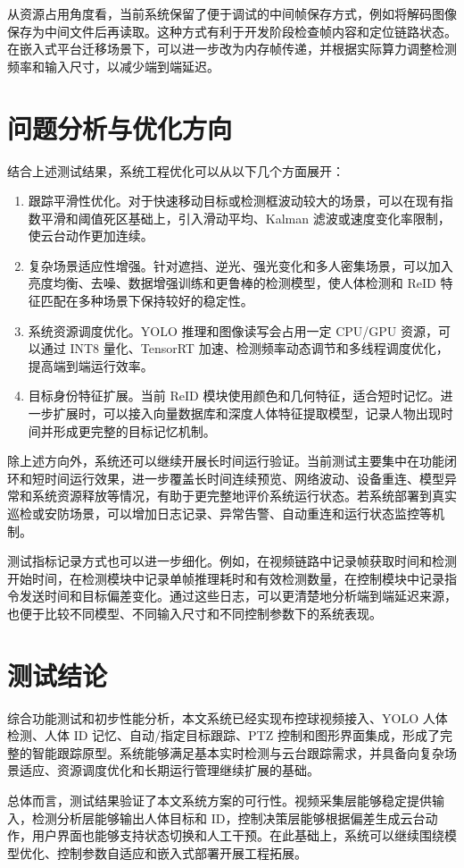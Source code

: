 从资源占用角度看，当前系统保留了便于调试的中间帧保存方式，例如将解码图像保存为中间文件后再读取。这种方式有利于开发阶段检查帧内容和定位链路状态。在嵌入式平台迁移场景下，可以进一步改为内存帧传递，并根据实际算力调整检测频率和输入尺寸，以减少端到端延迟。

\section{问题分析与优化方向}

结合上述测试结果，系统工程优化可以从以下几个方面展开：

\begin{enumerate}
    \item 跟踪平滑性优化。对于快速移动目标或检测框波动较大的场景，可以在现有指数平滑和阈值死区基础上，引入滑动平均、Kalman 滤波或速度变化率限制，使云台动作更加连续。
    \item 复杂场景适应性增强。针对遮挡、逆光、强光变化和多人密集场景，可以加入亮度均衡、去噪、数据增强训练和更鲁棒的检测模型，使人体检测和 ReID 特征匹配在多种场景下保持较好的稳定性。
    \item 系统资源调度优化。YOLO 推理和图像读写会占用一定 CPU/GPU 资源，可以通过 INT8 量化、TensorRT 加速、检测频率动态调节和多线程调度优化，提高端到端运行效率。
    \item 目标身份特征扩展。当前 ReID 模块使用颜色和几何特征，适合短时记忆。进一步扩展时，可以接入向量数据库和深度人体特征提取模型，记录人物出现时间并形成更完整的目标记忆机制。
\end{enumerate}

除上述方向外，系统还可以继续开展长时间运行验证。当前测试主要集中在功能闭环和短时间运行效果，进一步覆盖长时间连续预览、网络波动、设备重连、模型异常和系统资源释放等情况，有助于更完整地评价系统运行状态。若系统部署到真实巡检或安防场景，可以增加日志记录、异常告警、自动重连和运行状态监控等机制。

测试指标记录方式也可以进一步细化。例如，在视频链路中记录帧获取时间和检测开始时间，在检测模块中记录单帧推理耗时和有效检测数量，在控制模块中记录指令发送时间和目标偏差变化。通过这些日志，可以更清楚地分析端到端延迟来源，也便于比较不同模型、不同输入尺寸和不同控制参数下的系统表现。

\section{测试结论}

综合功能测试和初步性能分析，本文系统已经实现布控球视频接入、YOLO 人体检测、人体 ID 记忆、自动/指定目标跟踪、PTZ 控制和图形界面集成，形成了完整的智能跟踪原型。系统能够满足基本实时检测与云台跟踪需求，并具备向复杂场景适应、资源调度优化和长期运行管理继续扩展的基础。

总体而言，测试结果验证了本文系统方案的可行性。视频采集层能够稳定提供输入，检测分析层能够输出人体目标和 ID，控制决策层能够根据偏差生成云台动作，用户界面也能够支持状态切换和人工干预。在此基础上，系统可以继续围绕模型优化、控制参数自适应和嵌入式部署开展工程拓展。
